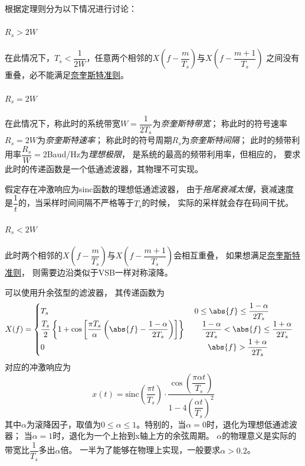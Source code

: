     根据定理则分为以下情况进行讨论：
    \paragraph{$R_s>2W$}\mbox{}

    在此情况下，$T_s<\dfrac{1}{2W}$，任意两个相邻的$X(f-\dfrac{m}{T_s})$与$X(f-\dfrac{m+1}{T_s})$
    之间没有重叠，必不能满足\hyperref[thm:Nyquist]{奈奎斯特准则}。

    \paragraph{$R_s=2W$}\mbox{}

    在此情况下，称此时的系统带宽$W=\dfrac{1}{2T_s}$为\emph{奈奎斯特带宽}；
    称此时的符号速率$R_s=2W$为\emph{奈奎斯特速率}；
    称此时的符号周期$R_s$为\emph{奈奎斯特间隔}；
    此时的频带利用率$\dfrac{R_s}{W}=2$Baud/Hz为\emph{理想极限}，
    是系统的最高的频带利用率，但相应的，
    要求此时的传递函数是一个低通滤波器，其物理不可实现。

    假定存在冲激响应为sinc函数的理想低通滤波器，
    由于\emph{拖尾衰减太慢}，衰减速度是$\dfrac{1}{t}$的，当采样时间间隔不严格等于$T_s$的时候，
    实际的采样就会存在码间干扰。

    \paragraph{$R_s<2W$}\mbox{}

    此时两个相邻的$X(f-\dfrac{m}{T_s})$与$X(f-\dfrac{m+1}{T_s})$会相互重叠，
    如果想满足\hyperref[thm:Nyquist]{奈奎斯特准则}，
    则需要边沿类似于VSB一样对称滚降。

    可以使用升余弦型的滤波器，
    其传递函数为
    \begin{equation}
        X(f)=\begin{cases}
            T_s\hspace{18.5em}0\leq\abs{f}\leq\dfrac{1-\alpha}{2T_s}\\
            \dfrac{T_s}{2}\left\{1+\cos\left[\dfrac{\pi T_s}{\alpha}\left(\abs{f}-\dfrac{1-\alpha}{2T_s}\right)\right]\right\}\hspace{2em}\dfrac{1-\alpha}{2T_s}<\abs{f}\leq\dfrac{1+\alpha}{2T_s}\\
            0\hspace{20.7em}\abs{f}>\dfrac{1+\alpha}{2T_s}
        \end{cases}
    \end{equation}
    对应的冲激响应为
    \begin{equation}
        x(t)=\text{sinc}\left(\frac{\pi t}{T_s}\right)\cdot\frac{\cos\left(\dfrac{\pi \alpha t}{T_s}\right)}{1-4\left(\dfrac{\alpha t}{T_s}\right)^2}
    \end{equation}
    其中$\alpha$为滚降因子，取值为$0\leq\alpha\leq1$。特别的，当$\alpha=0$时，退化为理想低通滤波器；
    当$\alpha=1$时，退化为一个上抬到x轴上方的余弦周期。
    $\alpha$的物理意义是实际的带宽比$\dfrac{1}{T_s}$多出$\alpha$倍。
    一半为了能够在物理上实现，一般要求$\alpha>0.2$。

